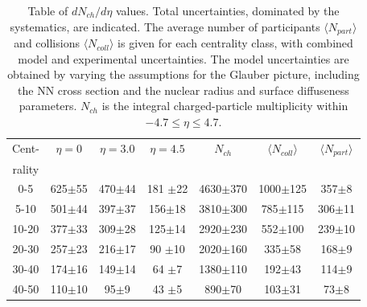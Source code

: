 \documentclass[preprint,showpacs,preprintnumbers,amsmath,amssymb]{revtex4}
\begin{document}
\begin{table} [ht]
  \caption{\label{tb:dndeta} 
    Table of $dN_{ch}/d\eta$ values. 
    Total uncertainties, dominated by
    the systematics, are indicated. The average
    number of participants $\langle N_{part}\rangle$ and collisions
    $\langle N_{coll}\rangle$ is given for each centrality
    class, with combined model and experimental uncertainties. The model
    uncertainties are obtained by varying the assumptions for the Glauber
    picture, including the NN cross section and the nuclear radius and
    surface diffuseness parameters. 
    $N_{ch}$ is the
    integral charged-particle multiplicity within %
    $-4.7 \le \eta \le 4.7$.}
  \begin{tabular}{ccccccc}
    \hline
    Cent- &
$\eta = 0$ &
$\eta = 3.0$ &
$\eta = 4.5$ &
$N_{ch}$ &
$\langle N_{coll}\rangle$&
$\langle N_{part}\rangle$
    \\
    rality &  & & & & & \\
    0-5 & 625$\pm$55 & 470$\pm$44
    & 181 $\pm$22 & 4630$\pm$370& 1000$\pm$125 & 357$\pm$8 \\
    5-10 & 501$\pm$44 & 397$\pm$37
    & 156$\pm$18 & 3810$\pm$300& 785$\pm$115 & 306$\pm$11 \\
    10-20 & 377$\pm$33 & 309$\pm$28
    & 125$\pm$14 & 2920$\pm$230 & 552$\pm$100 & 239$\pm$10 \\
    20-30 & 257$\pm$23 & 216$\pm$17
    & 90 $\pm$10 & 2020$\pm$160 & 335$\pm$58 & 168$\pm$9 \\
    30-40 & 174$\pm$16 & 149$\pm$14
    & 64 $\pm$7 & 1380$\pm$110 & 192$\pm$43 & 114$\pm$9 \\
    40-50 & 110$\pm$10 & 95$\pm$9
    & 43 $\pm$5 & 890$\pm$70 & 103$\pm$31 & 73$\pm$8 \\
    \hline
  \end{tabular}
\end{table}
\end{document}
